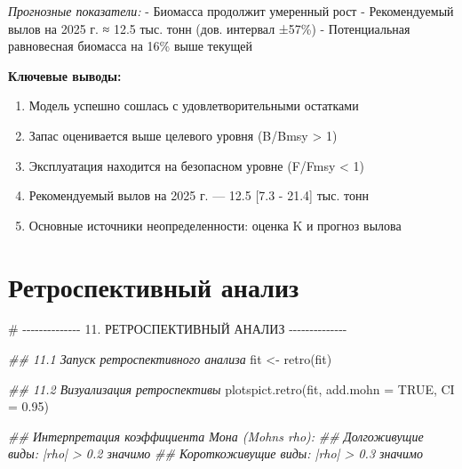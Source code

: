 \documentclass[
  letterpaper,
  DIV=11,
  numbers=noendperiod]{scrreprt}
\newenvironment{Shaded}{\begin{snugshade}}{\end{snugshade}}
\newcommand{\AttributeTok}[1]{\textcolor[rgb]{0.40,0.45,0.13}{#1}}
\newcommand{\CommentTok}[1]{\textcolor[rgb]{0.37,0.37,0.37}{#1}}
\newcommand{\ConstantTok}[1]{\textcolor[rgb]{0.56,0.35,0.01}{#1}}
\newcommand{\DocumentationTok}[1]{\textcolor[rgb]{0.37,0.37,0.37}{\textit{#1}}}
\newcommand{\FloatTok}[1]{\textcolor[rgb]{0.68,0.00,0.00}{#1}}
\newcommand{\FunctionTok}[1]{\textcolor[rgb]{0.28,0.35,0.67}{#1}}
\newcommand{\NormalTok}[1]{\textcolor[rgb]{0.00,0.23,0.31}{#1}}
\newcommand{\OtherTok}[1]{\textcolor[rgb]{0.00,0.23,0.31}{#1}}
\providecommand{\tightlist}{%
  \setlength{\itemsep}{0pt}\setlength{\parskip}{0pt}}
\begin{document}
\emph{Прогнозные показатели:} - Биомасса продолжит умеренный рост -
Рекомендуемый вылов на 2025 г. ≈ 12.5 тыс. тонн (дов. интервал ±57\%) -
Потенциальная равновесная биомасса на 16\% выше текущей

\textbf{Ключевые выводы:}

\begin{enumerate}
\def\labelenumi{\arabic{enumi}.}
\tightlist
\item
  Модель успешно сошлась с удовлетворительными остатками
\item
  Запас оценивается выше целевого уровня (B/Bmsy \textgreater{} 1)
\item
  Эксплуатация находится на безопасном уровне (F/Fmsy \textless{} 1)
\item
  Рекомендуемый вылов на 2025 г. --- 12.5 {[}7.3 - 21.4{]} тыс. тонн
\item
  Основные источники неопределенности: оценка K и прогноз вылова
\end{enumerate}

\section{Ретроспективный
анализ}\label{ux440ux435ux442ux440ux43eux441ux43fux435ux43aux442ux438ux432ux43dux44bux439-ux430ux43dux430ux43bux438ux437}

\begin{Shaded}
\begin{Highlighting}[]
\CommentTok{\# {-}{-}{-}{-}{-}{-}{-}{-}{-}{-}{-}{-}{-}{-} 11. РЕТРОСПЕКТИВНЫЙ АНАЛИЗ {-}{-}{-}{-}{-}{-}{-}{-}{-}{-}{-}{-}{-}{-}}

\DocumentationTok{\#\# 11.1 Запуск ретроспективного анализа}
\NormalTok{fit }\OtherTok{\textless{}{-}} \FunctionTok{retro}\NormalTok{(fit)}

\DocumentationTok{\#\# 11.2 Визуализация ретроспективы}
\FunctionTok{plotspict.retro}\NormalTok{(fit, }\AttributeTok{add.mohn =} \ConstantTok{TRUE}\NormalTok{, }\AttributeTok{CI =} \FloatTok{0.95}\NormalTok{)}

\DocumentationTok{\#\# Интерпретация коэффициента Мона (Mohn\textquotesingle{}s rho):}
\DocumentationTok{\#\# Долгоживущие виды: |rho| \textgreater{} 0.2 значимо}
\DocumentationTok{\#\# Короткоживущие виды: |rho| \textgreater{} 0.3 значимо}
\end{Highlighting}
\end{Shaded}
\end{document}
